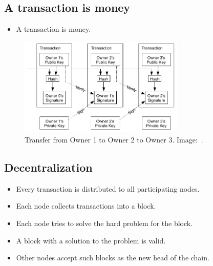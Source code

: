 \subsection{A transaction is money}

\begin{frame}
  \begin{idea}
    \begin{itemize}
      \item A transaction is money.
    \end{itemize}
  \end{idea}
  \begin{figure}
    \includegraphics[width=0.7\textwidth]{fig/bitcoin-transfer.png}
    \caption{Transfer from Owner 1 to Owner 2 to Owner 3.
    Image:~\cite{Nakamoto2008bap}.}
  \end{figure}
\end{frame}


\subsection{Decentralization}

\begin{frame}
  \begin{idea}
    \begin{itemize}
      \item Every transaction is distributed to all participating nodes.
      \item Each node collects transactions into a block.
      \item Each node tries to solve the hard problem for the block.
      \item A block with a solution to the problem is valid.
      \item Other nodes accept such blocks as the new head of the chain.
    \end{itemize}
  \end{idea}
\end{frame}


